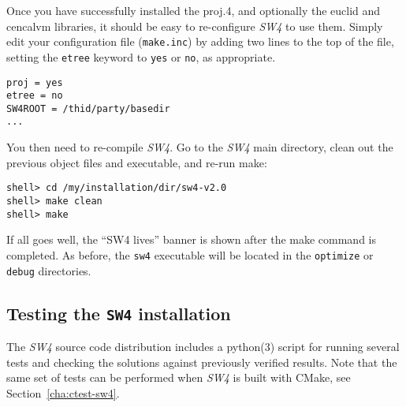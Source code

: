 \documentclass[11pt]{article}
\begin{document}
Once you have successfully installed the proj.4, and optionally the euclid and cencalvm libraries,
it should be easy to re-configure \emph{SW4} to use them. Simply edit your configuration file
(\verb+make.inc+) by adding two lines to the top of the file, setting the {\tt etree} keyword to
{\tt yes} or {\tt no}, as appropriate.
\begin{verbatim}
proj = yes
etree = no
SW4ROOT = /thid/party/basedir
...
\end{verbatim}
You then need to re-compile \emph{SW4}. Go to the \emph{SW4} main directory, clean out the previous
object files and executable, and re-run make:
\begin{verbatim}
shell> cd /my/installation/dir/sw4-v2.0
shell> make clean
shell> make
\end{verbatim}
If all goes well, the ``SW4 lives'' banner is shown after the make command is
completed. As before, the \verb+sw4+ executable will be located in the \verb+optimize+ or
\verb+debug+ directories.

\subsection{Testing the {\tt SW4} installation}
The \emph{SW4} source code distribution includes a python(3) script for running
several tests and checking the solutions against previously verified results. Note that the same set of tests can be
performed when \emph{SW4} is built with CMake, see Section~\ref{cha:ctest-sw4}.
\end{document}

